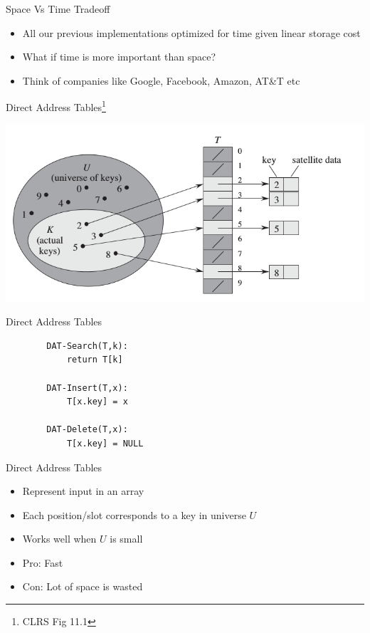 \documentclass{beamer}
\begin{document}
\begin{frame}{Space Vs Time Tradeoff}
    \begin{itemize}
        \item All our previous implementations optimized for time given linear storage cost
        \item What if time is more important than space?
        \item Think of companies like Google, Facebook, Amazon, AT\&T etc
    \end{itemize}
\end{frame}

\begin{frame}{Direct Address Tables\footnote{CLRS Fig 11.1}}
    \begin{center}
        \includegraphics[scale=0.4]{directAddrssTable.png}
    \end{center}
\end{frame}

\begin{frame}[fragile]{Direct Address Tables}
    \begin{verbatim}
        DAT-Search(T,k):
            return T[k]

        DAT-Insert(T,x):
            T[x.key] = x

        DAT-Delete(T,x):
            T[x.key] = NULL
    \end{verbatim}
\end{frame}

\begin{frame}{Direct Address Tables}
    \begin{itemize}
        \item Represent input in an array 
        \item Each position/slot corresponds to a key in universe $U$
        \item Works well when $U$ is small
        \item Pro: Fast
        \item Con: Lot of space is wasted
    \end{itemize}
\end{frame}
\end{document}
